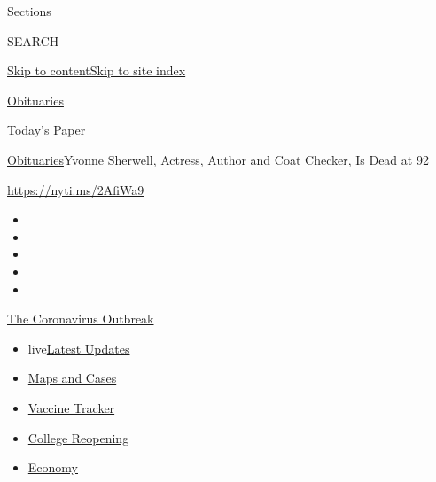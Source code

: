 Sections

SEARCH

\protect\hyperlink{site-content}{Skip to
content}\protect\hyperlink{site-index}{Skip to site index}

\href{https://www.nytimes3xbfgragh.onion/section/obituaries}{Obituaries}

\href{https://myaccount.nytimes3xbfgragh.onion/auth/login?response_type=cookie\&client_id=vi}{}

\href{https://www.nytimes3xbfgragh.onion/section/todayspaper}{Today's
Paper}

\href{/section/obituaries}{Obituaries}\textbar{}Yvonne Sherwell,
Actress, Author and Coat Checker, Is Dead at 92

\url{https://nyti.ms/2AfiWa9}

\begin{itemize}
\item
\item
\item
\item
\item
\end{itemize}

\href{https://www.nytimes3xbfgragh.onion/news-event/coronavirus?action=click\&pgtype=Article\&state=default\&region=TOP_BANNER\&context=storylines_menu}{The
Coronavirus Outbreak}

\begin{itemize}
\tightlist
\item
  live\href{https://www.nytimes3xbfgragh.onion/2020/08/04/world/coronavirus-covid-19.html?action=click\&pgtype=Article\&state=default\&region=TOP_BANNER\&context=storylines_menu}{Latest
  Updates}
\item
  \href{https://www.nytimes3xbfgragh.onion/interactive/2020/us/coronavirus-us-cases.html?action=click\&pgtype=Article\&state=default\&region=TOP_BANNER\&context=storylines_menu}{Maps
  and Cases}
\item
  \href{https://www.nytimes3xbfgragh.onion/interactive/2020/science/coronavirus-vaccine-tracker.html?action=click\&pgtype=Article\&state=default\&region=TOP_BANNER\&context=storylines_menu}{Vaccine
  Tracker}
\item
  \href{https://www.nytimes3xbfgragh.onion/2020/08/02/us/covid-college-reopening.html?action=click\&pgtype=Article\&state=default\&region=TOP_BANNER\&context=storylines_menu}{College
  Reopening}
\item
  \href{https://www.nytimes3xbfgragh.onion/live/2020/08/03/business/stock-market-today-coronavirus?action=click\&pgtype=Article\&state=default\&region=TOP_BANNER\&context=storylines_menu}{Economy}
\end{itemize}

